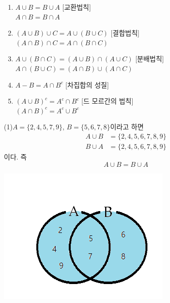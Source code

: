 \documentclass{oblivoir}
\begin{document}
%
\begin{mdframed}
\begin{enumerate}\label{properties1}
\item
\(A\cup B=B\cup A\)
[교환법칙]\\
\(A\cap B=B\cap A\)
\item
\((A\cup B)\cup C=A\cup(B\cup C)\)
[결합법칙]\\
\((A\cap B)\cap C=A\cap(B\cap C)\)
\item
\(A\cup(B\cap C)=(A\cup B)\cap(A\cup C)\)
[분배법칙]\\
\(A\cap(B\cup C)=(A\cap B)\cup(A\cap C)\)
\item
\(A-B=A\cap B^c\)
[차집합의 성질]
\item
\((A\cup B)^c=A^c\cap B^c\)
[드 모르간의 법칙]\\
\((A\cap B)^c=A^c\cup B^c\)
\end{enumerate}
\end{mdframed}

%
\begin{minipage}{0.65\textwidth}\label{properties2}
(1)\:\(A=\{2,4,5,7,9\}\), \(B=\{5,6,7,8\}\)이라고 하면
\begin{align*}
A\cup B&=\{2,4,5,6,7,8,9\}\\
B\cup A&=\{2,4,5,6,7,8,9\}
\end{align*}
이다.
즉
\[A\cup B=B\cup A\]
\end{minipage}
\begin{minipage}{0.3\textwidth}
\begin{center}
\includegraphics[width=\textwidth]{properties_2-1}
\end{center}
\end{minipage}
\end{document}
